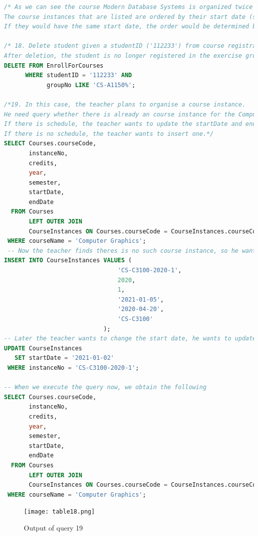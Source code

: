 \documentclass{article}
\begin{document}
 \begin{lstlisting}[language=SQL]
/* As we can see the course Modern Database Systems is organized twice in 2020.
The course instances that are listed are ordered by their start date (starting the earliest).
If they would have the same start date, the order would be determined by the end date (earliest first). */

/* 18. Delete student given a studentID ('112233') from course registration in course with course code CS-A1150. 
After deletion, the student is no longer registered in the exercise group and, thus, not in the course either.*/
DELETE FROM EnrollForCourses
      WHERE studentID = '112233' AND 
            groupNo LIKE 'CS-A1150%';

/*19. In this case, the teacher plans to organise a course instance. 
He need query whether there is already an course instance for the Computer Graphics recently. 
If there is schedule, the teacher wants to update the startDate and endDate. 
If there is no schedule, the teacher wants to insert one.*/
SELECT Courses.courseCode,
       instanceNo,
       credits,
       year,
       semester,
       startDate,
       endDate
  FROM Courses
       LEFT OUTER JOIN
       CourseInstances ON Courses.courseCode = CourseInstances.courseCode
 WHERE courseName = 'Computer Graphics';
 -- Now the teacher finds theres is no such course instance, so he wants to insert one.
INSERT INTO CourseInstances VALUES (
                                'CS-C3100-2020-1',
                                2020,
                                1,
                                '2021-01-05',
                                '2020-04-20',
                                'CS-C3100'
                            );
-- Later the teacher wants to change the start date, he wants to update it.
UPDATE CourseInstances
   SET startDate = '2021-01-02'
 WHERE instanceNo = 'CS-C3100-2020-1';

-- When we execute the query now, we obtain the following
SELECT Courses.courseCode,
       instanceNo,
       credits,
       year,
       semester,
       startDate,
       endDate
  FROM Courses
       LEFT OUTER JOIN
       CourseInstances ON Courses.courseCode = CourseInstances.courseCode
 WHERE courseName = 'Computer Graphics';
\end{lstlisting}

\begin{figure}[!h]
	\centering
	\texttt{[image: table18.png]}
	\caption{Output of query 19}
	\label{fig:19}
\end{figure}
\end{document}
